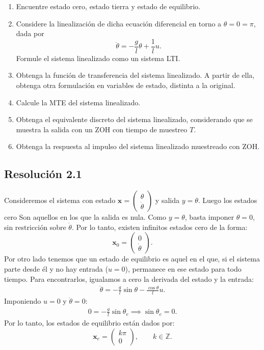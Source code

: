 \documentclass[
  11pt,
  letterpaper,
   addpoints,
  answers
  ]{exam}
\begin{document}
\begin{questions}
\begin{enumerate}
    \item Encuentre estado cero, estado tierra y estado de equilibrio.
    \item Considere la linealización de dicha ecuación diferencial en torno a $\theta = 0 = \pi$, dada por
    \begin{equation}
        \ddot{\theta} = -\frac{g}{l} \theta + \frac{1}{l} u.
    \end{equation}
    Formule el sistema linealizado como un sistema LTI.
    \item Obtenga la función de transferencia del sistema linealizado. A partir de ella, obtenga otra formulación en variables de estado, distinta a la original.
    \item Calcule la MTE del sistema linealizado.
    \item Obtenga el equivalente discreto del sistema linealizado, considerando que se muestra la salida con un ZOH con tiempo de muestreo $T$.
    \item Obtenga la respuesta al impulso del sistema linealizado muestreado con ZOH.
\end{enumerate}
\begin{solution}

\subsection*{Resolución 2.1}
Consideremos el sistema con estado $\mathbf{x} = \begin{pmatrix} \theta \\ \dot{\theta} \end{pmatrix}$ y salida $y = \theta$. Luego los estados cero Son aquellos en los que la salida es nula. Como $y = \theta$, basta imponer $\theta = 0$, sin restricción sobre $\dot{\theta}$. Por lo tanto, existen infinitos estados cero de la forma:
\begin{equation}
\mathbf{x}_0 = \begin{pmatrix} 0 \\ \dot{\theta} \end{pmatrix}.
\end{equation}
Por otro lado tenemos que un estado de equilibrio es aquel en el que, si el sistema parte desde él y no hay entrada ($u = 0$), permanece en ese estado para todo tiempo. Para encontrarlos, igualamos a cero la derivada del estado y la entrada:
\begin{align}
\ddot{\theta} = -\frac{g}{l} \sin \theta - \frac{\cos \theta}{l} u.
\end{align}
Imponiendo $u = 0$ y $\ddot{\theta} = 0$:
\begin{align}
0 = -\frac{g}{l} \sin \theta_e \implies \sin \theta_e = 0.
\end{align}
Por lo tanto, los estados de equilibrio están dados por:
\begin{equation}
\mathbf{x}_e = \begin{pmatrix} k\pi \\ 0 \end{pmatrix}, \qquad k \in \mathbb{Z}.
\end{equation}


\end{solution}
\end{questions}
\end{document}
